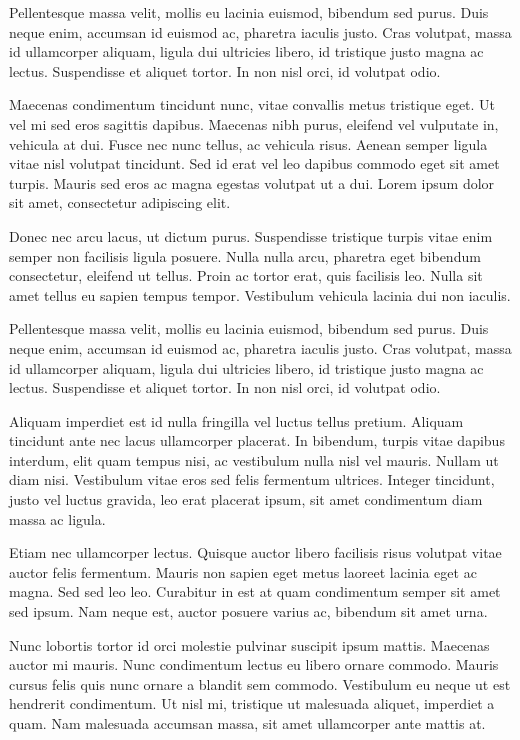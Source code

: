 Pellentesque massa velit, mollis eu lacinia euismod, bibendum sed purus. Duis neque enim, accumsan id euismod ac, pharetra iaculis justo. Cras volutpat, massa id ullamcorper aliquam, ligula dui ultricies libero, id tristique justo magna ac lectus. Suspendisse et aliquet tortor. In non nisl orci, id volutpat odio. 

Maecenas condimentum tincidunt nunc, vitae convallis metus tristique eget. Ut vel mi sed eros sagittis dapibus. Maecenas nibh purus, eleifend vel vulputate in, vehicula at dui. Fusce nec nunc tellus, ac vehicula risus. Aenean semper ligula vitae nisl volutpat tincidunt. Sed id erat vel leo dapibus commodo eget sit amet turpis. Mauris sed eros ac magna egestas volutpat ut a dui. Lorem ipsum dolor sit amet, consectetur adipiscing elit.

Donec nec arcu lacus, ut dictum purus. Suspendisse tristique turpis vitae enim semper non facilisis ligula posuere. Nulla nulla arcu, pharetra eget bibendum consectetur, eleifend ut tellus. Proin ac tortor erat, quis facilisis leo. Nulla sit amet tellus eu sapien tempus tempor. Vestibulum vehicula lacinia dui non iaculis. 

Pellentesque massa velit, mollis eu lacinia euismod, bibendum sed purus. Duis neque enim, accumsan id euismod ac, pharetra iaculis justo. Cras volutpat, massa id ullamcorper aliquam, ligula dui ultricies libero, id tristique justo magna ac lectus. Suspendisse et aliquet tortor. In non nisl orci, id volutpat odio. 

Aliquam imperdiet est id nulla fringilla vel luctus tellus pretium. Aliquam tincidunt ante nec lacus ullamcorper placerat. In bibendum, turpis vitae dapibus interdum, elit quam tempus nisi, ac vestibulum nulla nisl vel mauris. Nullam ut diam nisi. Vestibulum vitae eros sed felis fermentum ultrices. Integer tincidunt, justo vel luctus gravida, leo erat placerat ipsum, sit amet condimentum diam massa ac ligula. 

Etiam nec ullamcorper lectus. Quisque auctor libero facilisis risus volutpat vitae auctor felis fermentum. Mauris non sapien eget metus laoreet lacinia eget ac magna. Sed sed leo leo. Curabitur in est at quam condimentum semper sit amet sed ipsum. Nam neque est, auctor posuere varius ac, bibendum sit amet urna. 

Nunc lobortis tortor id orci molestie pulvinar suscipit ipsum mattis. Maecenas auctor mi mauris. Nunc condimentum lectus eu libero ornare commodo. Mauris cursus felis quis nunc ornare a blandit sem commodo. Vestibulum eu neque ut est hendrerit condimentum. Ut nisl mi, tristique ut malesuada aliquet, imperdiet a quam. Nam malesuada accumsan massa, sit amet ullamcorper ante mattis at.



